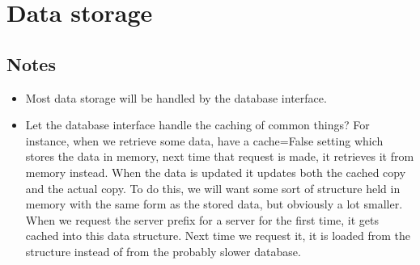 \documentclass[a4paper]{amsart}
\begin{document}
\section{Data storage}
\subsection{Notes}
\begin{itemize}
    \item Most data storage will be handled by the database interface.
    \item Let the database interface handle the caching of common things? For instance, when we retrieve some data, have a cache=False setting which stores the data in memory, next time that request is made, it retrieves it from memory instead. When the data is updated it updates both the cached copy and the actual copy. To do this, we will want some sort of structure held in memory with the same form as the stored data, but obviously a lot smaller. When we request the server prefix for a server for the first time, it gets cached into this data structure. Next time we request it, it is loaded from the structure instead of from the probably slower database.
\end{itemize}
\end{document}
